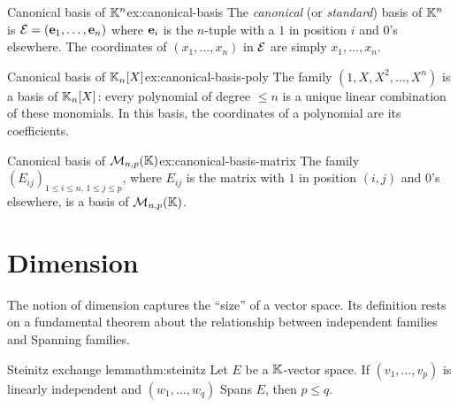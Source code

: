 \begin{example}{Canonical basis of ${\mathbb{K}}^n$}{ex:canonical-basis}
The \emph{canonical} (or \emph{standard}) basis of ${\mathbb{K}}^n$ is
${\mathcal{E}} = (\mathbf{e}_{1},\ldots,\mathbf{e}_{n})$ where $\mathbf{e}_{i}$ is the $n$-tuple
with a $1$ in position $i$ and $0$'s elsewhere. The coordinates of
$(x_1,\ldots,x_n)$ in ${\mathcal{E}}$ are simply $x_1,\ldots,x_n$.
\end{example}

\begin{example}{Canonical basis of ${\mathbb{K}}_n[X]$}{ex:canonical-basis-poly}
The family $(1,X,X^2,\ldots,X^n)$ is a basis of ${\mathbb{K}}_n[X]$: every
polynomial of degree $\leq n$ is a unique linear combination of these
monomials. In this basis, the coordinates of a polynomial are its
coefficients.
\end{example}

\begin{example}{Canonical basis of $\mathcal{M}_{n,p}({\mathbb{K}})$}{ex:canonical-basis-matrix}
The family $(E_{ij})_{1\leq i\leq n,\,1\leq j\leq p}$, where $E_{ij}$
is the matrix with $1$ in position $(i,j)$ and $0$'s elsewhere, is a
basis of $\mathcal{M}_{n,p}({\mathbb{K}})$.
\end{example}


\section{Dimension}\label{sec:dimension}

The notion of dimension captures the ``size'' of a vector space. Its
definition rests on a fundamental theorem about the relationship between
independent families and Spanning families.

\begin{theorem}{Steinitz exchange lemma}{thm:steinitz}
Let $E$ be a ${\mathbb{K}}$-vector space. If $(v_1,\ldots,v_p)$ is linearly
independent and $(w_1,\ldots,w_q)$ Spans $E$, then $p\leq q$.
\end{theorem}

